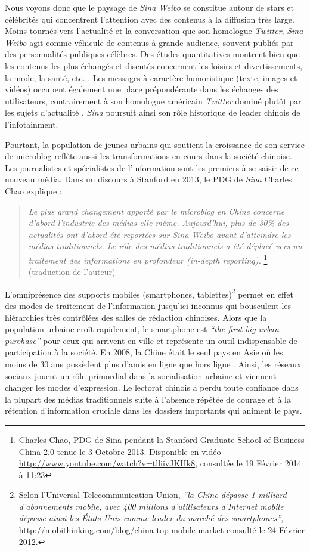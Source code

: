 Nous voyons donc que le paysage de \textit{Sina Weibo} se constitue autour de stars et célébrités qui concentrent l’attention avec des contenus à la diffusion très large. Moins tournés vers l’actualité et la conversation que son homologue \textit{Twitter}, \textit{Sina Weibo} agit comme véhicule de contenus à grande audience, souvent publiés par des personnalités publiques célèbres. Des études quantitatives montrent bien que les contenus les plus échangés et discutés concernent les loisirs et divertissements, la mode, la santé, etc. \citep{Li2013}. Les messages à caractère humoristique (texte, images et vidéos) occupent également une place prépondérante dans les échanges des utilisateurs, contrairement à son homologue américain \textit{Twitter} dominé plutôt par les sujets d’actualité \citep{Yu2011}. \textit{Sina} poursuit ainsi son rôle historique de leader chinois de l’infotainment. 

Pourtant, la population de jeunes urbains qui soutient la croissance de son service de microblog reflète aussi les transformations en cours dans la société chinoise. Les journalistes et spécialistes de l’information sont les premiers à se saisir de ce nouveau média. Dans un discours à Stanford en 2013, le PDG de \textit{Sina} Charles Chao explique : 

\begin{quote}
\textit{Le plus grand changement apporté par le microblog en Chine concerne d’abord l’industrie des médias elle-même. Aujourd’hui, plus de 30\% des actualités ont d’abord été reportées sur \textit{Sina Weibo} avant d’atteindre les médias   traditionnels. Le rôle des médias traditionnels a été déplacé vers un traitement des informations en profondeur (in-depth reporting).} \footnote {Charles Chao, PDG de Sina pendant la Stanford Graduate School of Business China 2.0 tenue le 3 Octobre 2013. Disponible en vidéo \url{http://www.youtube.com/watch?v=tlliivJKHk8}, consultée le 19 Février 2014 à 11:23} (traduction de l’auteur)
\end{quote}

L’omniprésence des supports mobiles (smartphones, tablettes)\footnote{Selon l’Universal Telecommunication Union, \textit{``la Chine dépasse 1 milliard d’abonnements mobile, avec 400 millions d’utilisateurs d’Internet mobile dépasse ainsi les États-Unis comme leader du marché des smartphones''}, \url{http://mobithinking.com/blog/china-top-mobile-market} consulté le 24 Février 2012.} permet en effet des modes de traitement de l’information jusqu’ici inconnus qui bousculent les hiérarchies très contrôlées des salles de rédaction chinoises. Alors que la population urbaine croît rapidement, le smartphone est \textit{``the first big urban purchase''} \citep{Wallis2013} pour ceux qui arrivent en ville et représente un outil indispensable de participation à la société. En 2008, la Chine était le seul pays en Asie où les moins de 30 ans possèdent plus d’amis en ligne que hors ligne \citep{Hinckley2009}. Ainsi, les réseaux sociaux jouent un rôle primordial dans la socialisation urbaine et viennent changer les modes d’expression. Le lectorat chinois a perdu toute confiance dans la plupart des médias traditionnels suite à l’absence répétée de courage et à la rétention d’information cruciale dans les dossiers importants qui animent le pays. 

